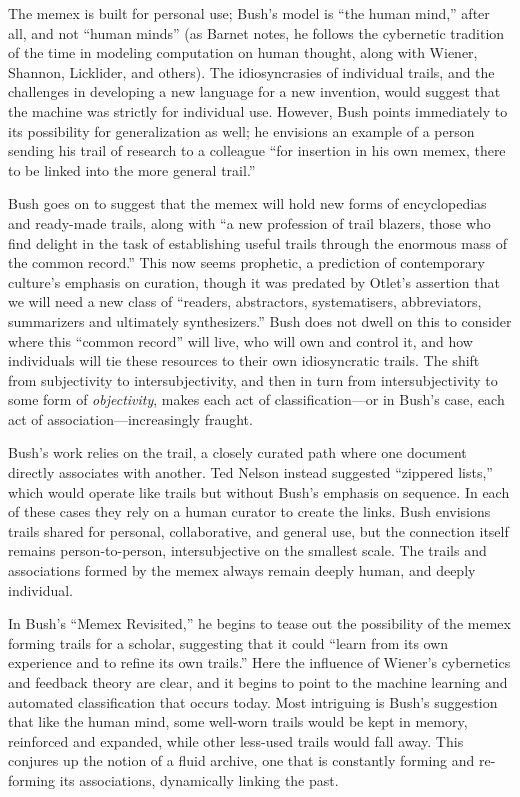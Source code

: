 The memex is built for personal use; Bush's model is ``the human mind,'' after all, and not ``human minds'' (as Barnet notes, he follows the cybernetic tradition of the time in modeling computation on human thought, along with Wiener, Shannon, Licklider, and others).\autocite{barnet_technical_2008} The idiosyncrasies of individual trails, and the challenges in developing a new language for a new invention, would suggest that the machine was strictly for individual use. However, Bush points immediately to its possibility for generalization as well; he envisions an example of a person sending his trail of research to a colleague ``for insertion in his own memex, there to be linked into the more general trail.''\autocite{bush_as_1945}

Bush goes on to suggest that the memex will hold new forms of encyclopedias and ready-made trails, along with ``a new profession of trail blazers, those who find delight in the task of establishing useful trails through the enormous mass of the common record.''\autocite{bush_as_1945} This now seems prophetic, a prediction of contemporary culture's emphasis on curation, though it was predated by Otlet's assertion that we will need a new class of ``readers, abstractors, systematisers, abbreviators, summarizers and ultimately synthesizers.''\autocite[23]{reagle_good_2010} Bush does not dwell on this to consider where this ``common record'' will live, who will own and control it, and how individuals will tie these resources to their own idiosyncratic trails. The shift from subjectivity to intersubjectivity, and then in turn from intersubjectivity to some form of \emph{objectivity}, makes each act of classification---or in Bush's case, each act of association---increasingly fraught.

Bush's work relies on the trail, a closely curated path where one document directly associates with another. Ted Nelson instead suggested ``zippered lists,'' which would operate like trails but without Bush's emphasis on sequence.\autocite[84, 89]{nelson_complex_1965} In each of these cases they rely on a human curator to create the links. Bush envisions trails shared for personal, collaborative, and general use, but the connection itself remains person-to-person, intersubjective on the smallest scale. The trails and associations formed by the memex always remain deeply human, and deeply individual.

In Bush's ``Memex Revisited,'' he begins to tease out the possibility of the memex forming trails for a scholar, suggesting that it could ``learn from its own experience and to refine its own trails.''\autocite[211]{bush_memex_1991} Here the influence of Wiener's cybernetics and feedback theory are clear, and it begins to point to the machine learning and automated classification that occurs today. Most intriguing is Bush's suggestion that like the human mind, some well-worn trails would be kept in memory, reinforced and expanded, while other less-used trails would fall away. This conjures up the notion of a fluid archive, one that is constantly forming and re-forming its associations, dynamically linking the past.


